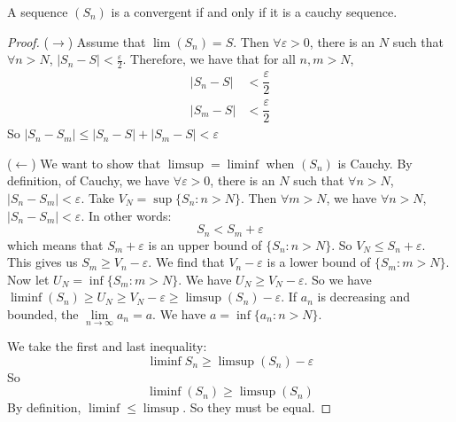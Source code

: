 \documentclass{report}
\begin{document}
\begin{theorem}{10}
    A sequence $(S_{n})$ is a convergent if and only if it is a cauchy sequence.
\end{theorem}
    \begin{proof}
        ($\rightarrow $) Assume that $\lim(S_{n}) = S$. Then $\forall \varepsilon > 0$, there is an $N$ such that $\forall n > N$, $\lvert S_{n} - S \rvert < \frac{\varepsilon}{2}$. Therefore, we have that for all $n, m > N$, 
            \begin{align*}
                \lvert S_{n} - S \rvert &<  \dfrac{\varepsilon}{2} \\
                \lvert S_{m} - S \rvert &<  \dfrac{\varepsilon}{2}   
            \end{align*}
        So $\lvert S_{n} - S_{m} \rvert \leq \lvert S_{n} - S \rvert + \lvert S_{m} - S \rvert < \varepsilon$

        ($\leftarrow $) We want to show that $\limsup  = \liminf $ when $(S_{n})$ is Cauchy. By definition, of Cauchy, we have $\forall \varepsilon > 0$, there is an $N$ such that $\forall n > N$, $\lvert S_{n} - S_{m} \rvert < \varepsilon$. Take $V_{N} = \sup \{S_{n} : n> N\}$. Then $\forall m > N$, we have $\forall n > N$, $\lvert S_{n} - S_{m} \rvert < \varepsilon$. In other words:
            \begin{equation*}
                S_{n} < S_{m} + \varepsilon
            \end{equation*}
        which means that $S_{m} + \varepsilon$ is an upper bound of $\{S_{n} : n > N\}$. So $V_{N} \leq S_{n} + \varepsilon$. This gives us $S_{m} \geq V_{n} - \varepsilon$. We find that $V_{n} - \varepsilon$ is a lower bound of $\{S_{m} : m > N\}$. Now let $U_{N} = \inf \{S_{m} : m > N\}$. We have $U_{N} \geq V_{N} - \varepsilon$. So we have $\liminf (S_{n}) \geq U_{N} \geq V_{N} - \varepsilon \geq \limsup (S_{n}) - \varepsilon$. If $a_{n}$ is decreasing and bounded, the $\lim\limits_{n \to \infty}a_{n} = a$. We have $a = \inf \{a_{n}: n > N\}$.

        We take the first and last inequality:
            \begin{equation*}
                \liminf S_{n} \geq \limsup (S_{n}) - \varepsilon
            \end{equation*}
        So 
            \begin{equation*}
                \liminf (S_{n}) \geq \limsup (S_{n})
            \end{equation*}
        By definition, $\liminf  \leq \limsup $. So they must be equal.
    \end{proof}
\end{document}
